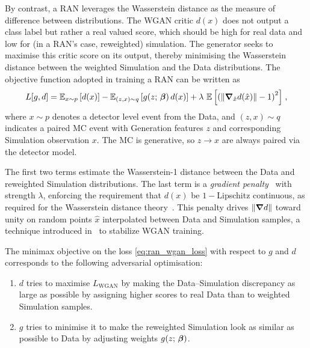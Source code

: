 {{            By contrast, a RAN leverages the Wasserstein distance as the measure of difference between distributions.
            The WGAN critic $d(x)$ does not output a class label but rather a real valued score, which should be high for real data and low for (in a RAN's case, reweighted) simulation.
            The generator seeks to maximise this critic score on its output, thereby minimising the Wasserstein distance between the weighted Simulation and the Data distributions.
            The objective function adopted in training a RAN can be written as
            \begin{align}
                \label{eq:ran_wgan_loss}
                L[g,d] = \operatorname{\mathbb{E}}_{x\sim p}\qty[d(x)] - \operatorname{\mathbb{E}}_{(z,x)\sim q}\qty[g(z;\,\vb*\beta)\,d(x)]+\lambda\,\operatorname{\mathbb{E}}\qty[\qty(\norm{\grad_{\hat{x}}d(\hat{x})} - 1)^2]\;,
            \end{align}
            where $x\sim p$ denotes a detector level event from the Data, and $(z,x)\sim q$ indicates a paired MC event with Generation features $z$ and corresponding Simulation observation $x$.
            The MC is generative, so $z\to x$ are always paired via the detector model.
            
            The first two terms estimate the Wasserstein-1 distance between the Data and reweighted Simulation distributions.
            The last term is a \emph{gradient penalty}~\cite{xia_penalty_2023} with strength $\lambda$, enforcing the requirement that $d(x)$ be \(1-\)Lipschitz continuous, as required for the Wasserstein distance theory~\cite{OptimalDistance}.
            This penalty drives $\norm{\grad d}$ toward unity on random points $\hat{x}$ interpolated between Data and Simulation samples, a technique introduced in~\cite{gulrajani_improved_2017} to stabilize WGAN training.
            
            The minimax objective on the loss \cref{eq:ran_wgan_loss} with respect to $g$ and $d$ corresponds to the following adversarial optimisation:
            \begin{enumerate}
                \item $d$ tries to maximise $L_{\text{WGAN}}$ by making the Data--Simulation discrepancy as large as possible by assigning higher scores to real Data than to weighted Simulation samples.
                \item $g$ tries to minimise it to make the reweighted Simulation look as similar as possible to Data by adjusting weights $g(z;\,\vb*\beta)$.
            \end{enumerate}

}}
